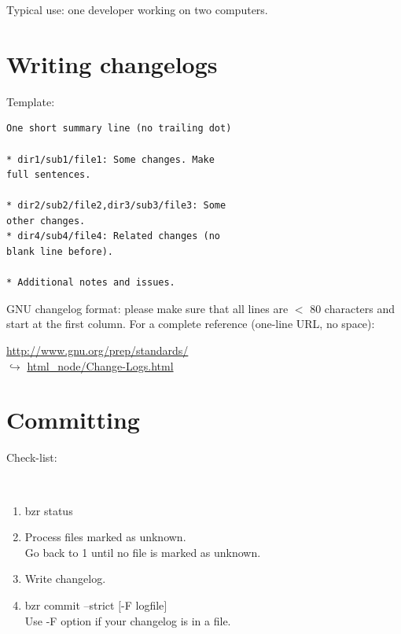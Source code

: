 \documentclass[tumble,foldmark,a4paper]{leaflet}
\begin{document}
Typical use: one developer working on two computers.

\newpage

\section*{Writing changelogs}

Template:

\vspace{-0.5em}

\begin{verbatim}
One short summary line (no trailing dot)

* dir1/sub1/file1: Some changes. Make
full sentences.

* dir2/sub2/file2,dir3/sub3/file3: Some
other changes.
* dir4/sub4/file4: Related changes (no
blank line before).

* Additional notes and issues.
\end{verbatim}

GNU changelog format: please make sure that all lines are $<$ 80
characters and start at the first column. For a complete reference
(one-line URL, no space):
\begin{center}
 \url{http://www.gnu.org/prep/standards/} \\
 $\hookrightarrow$ \url{html_node/Change-Logs.html}
\end{center}

\section*{Committing}

Check-list:
{\tt
\begin{enumerate}
 \item bzr status
 \item Process files marked as unknown. \\
       Go back to 1 until no file is marked as unknown.
 \item Write changelog.
 \item bzr commit --strict $[$-F logfile$]$ \\
       Use -F option if your changelog is in a file.
\end{enumerate}
}

\vspace{0.5em}

\begin{center}
\end{center}
\end{document}
